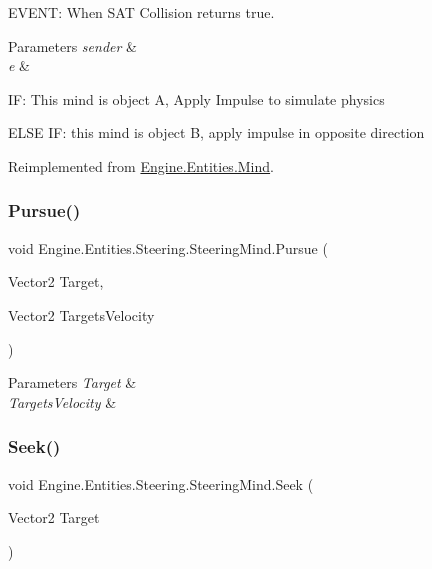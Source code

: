 E\+V\+E\+NT\+: When S\+AT Collision returns true. 


\begin{DoxyParams}{Parameters}
{\em sender} & \\
\hline
{\em e} & \\
\hline
\end{DoxyParams}
IF\+: This mind is object A, Apply Impulse to simulate physics

E\+L\+SE IF\+: this mind is object B, apply impulse in opposite direction 

Reimplemented from \hyperlink{a00318_ac278d4358d794426251d1b87b6aa7b82}{Engine.\+Entities.\+Mind}.

\mbox{\label{a00346_a14fb4afcb6260502a8c545279ed6c8dc}} 
\subsubsection{\texorpdfstring{Pursue()}{Pursue()}}
{\footnotesize\ttfamily void Engine.\+Entities.\+Steering.\+Steering\+Mind.\+Pursue (\begin{DoxyParamCaption}\item[{Vector2}]{Target,  }\item[{Vector2}]{Targets\+Velocity }\end{DoxyParamCaption})\hspace{0.3cm}{\ttfamily [inline]}}






\begin{DoxyParams}{Parameters}
{\em Target} & \\
\hline
{\em Targets\+Velocity} & \\
\hline
\end{DoxyParams}
\mbox{\label{a00346_afb0d53f8cb93f437b89dbdc5ac0f71a2}} 
\subsubsection{\texorpdfstring{Seek()}{Seek()}}
{\footnotesize\ttfamily void Engine.\+Entities.\+Steering.\+Steering\+Mind.\+Seek (\begin{DoxyParamCaption}\item[{Vector2}]{Target }\end{DoxyParamCaption})\hspace{0.3cm}{\ttfamily [inline]}}






